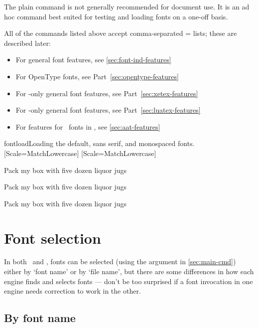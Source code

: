 \documentclass[a4paper]{l3doc}
\begin{document}
\bigskip
{}

The plain  command is not generally recommended for document use. It is an
ad hoc command best suited for testing and loading fonts on a one-off basis.

All of the commands listed above accept comma-separated
= lists; these are described later:
\begin{itemize}
\item For general font features, see \vref{sec:font-ind-features}
\item For OpenType fonts, see Part~\vref{sec:opentype-features}
\item For \XeTeX-only general font features, see Part~\vref{sec:xetex-features}
\item For \LuaTeX-only general font features, see Part~\vref{sec:luatex-features}
\item For features for \AAT\ fonts in \XeTeX, see \vref{sec:aat-features}
\end{itemize}

\begin{Lexample}{fontload}{Loading the default, sans serif, and monospaced fonts.}
  \setmainfont{texgyrebonum-regular.otf}
  \setsansfont{lmsans10-regular.otf}[Scale=MatchLowercase]
  \setmonofont{Inconsolatazi4-Regular.otf}[Scale=MatchLowercase]

  \rmfamily Pack my box with five dozen liquor jugs\par
  \sffamily Pack my box with five dozen liquor jugs\par
  \ttfamily Pack my box with five dozen liquor jugs
\end{Lexample}

\section{Font selection}

In both \LuaTeX\ and \XeTeX, fonts can be selected (using the  argument in \ref{sec:main-cmd}) either by `font name' or by `file name', but there are some differences in how each engine finds and selects fonts --- don't be too surprised if a font invocation in one engine needs correction to work in the other.


\subsection{By font name}
\end{document}

